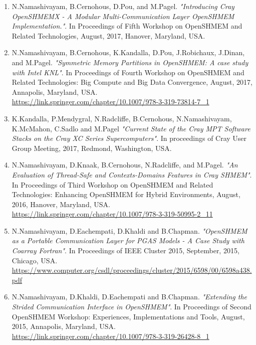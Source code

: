 \begin{enumerate}
\setcounter{enumi}{0}
\item N.Namashivayam, B.Cernohous, D.Pou, and M.Pagel.
      \textit{"Introducing Cray OpenSHMEMX - A Modular Multi-Communication Layer
      OpenSHMEM Implementation."}. In Proceedings of Fifth Workshop on OpenSHMEM
      and Related Technologies, August, 2017, Hanover, Maryland, USA.
\item N.Namashivayam, B.Cernohous, K.Kandalla, D.Pou,
      J.Robichaux, J.Dinan, and M.Pagel.
      \textit{"Symmetric Memory Partitions in OpenSHMEM: A case study with
      Intel KNL"}. In Proceedings of Fourth Workshop on OpenSHMEM and
      Related Technologies: Big Compute and Big Data Convergence, August,
      2017, Annapolis, Maryland, USA.\\
      \url{https://link.springer.com/chapter/10.1007/978-3-319-73814-7_1}
\item K.Kandalla, P.Mendygral, N.Radcliffe, B.Cernohous,
      N.Namashivayam, K.McMahon, C.Sadlo and M.Pagel
      \textit{"Current State of the Cray MPT Software Stacks on the Cray XC
      Series Supercomputers"}. In proceedings of Cray User Group Meeting,
      2017, Redmond, Washington, USA.
\item N.Namashivayam, D.Knaak, B.Cernohous, N.Radcliffe, and
      M.Pagel.
      \textit{"An Evaluation of Thread-Safe and Contexts-Domains Features in
      Cray SHMEM"}. In Proceedings of Third Workshop on OpenSHMEM and Related
      Technologies: Enhancing OpenSHMEM for Hybrid Environments, August, 2016,
      Hanover, Maryland, USA.\\
      \url{https://link.springer.com/chapter/10.1007/978-3-319-50995-2_11}
\item N.Namashivayam, D.Eachempati, D.Khaldi and B.Chapman.
      \textit{"OpenSHMEM as a Portable Communication Layer for PGAS Models - A
      Case Study with Coarray Fortran"}. In Proceedings of IEEE Cluster 2015,
      September, 2015, Chicago, USA.\\
      \url{https://www.computer.org/csdl/proceedings/cluster/2015/6598/00/6598a438.pdf}
\item N.Namashivayam, D.Khaldi, D.Eachempati and B.Chapman.
      \textit{"Extending the Strided Communication Interface in OpenSHMEM"}. In
      Proceedings of Second OpenSHMEM Workshop: Experiences, Implementations and
      Tools, August, 2015, Annapolis, Maryland, USA.\\
      \url{https://link.springer.com/chapter/10.1007/978-3-319-26428-8_1}

\end{enumerate}
